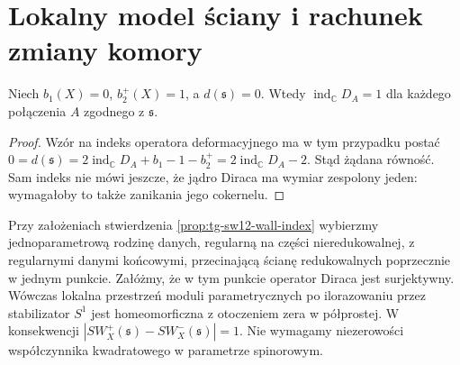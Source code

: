 \section{Lokalny model ściany i rachunek zmiany komory}
\label{sec:tg-sw12-wall}

\begin{stwierdzenie}
\label{prop:tg-sw12-wall-index}
Niech $b_1(X)=0$, $b_2^+(X)=1$, a
$d(\mathfrak s)=0$. Wtedy
$\operatorname{ind}_\mathbb C D_A=1$
dla każdego połączenia $A$ zgodnego z $\mathfrak s$.
\end{stwierdzenie}

\begin{proof}
Wzór na indeks operatora deformacyjnego ma w tym
przypadku postać
$0=d(\mathfrak s)=2\operatorname{ind}_\mathbb C D_A
+b_1-1-b_2^+=2\operatorname{ind}_\mathbb C D_A-2$.
Stąd żądana równość. Sam indeks nie mówi jeszcze,
że jądro Diraca ma wymiar zespolony jeden: wymagałoby
to także zanikania jego cokernelu.
\end{proof}

\begin{twierdzenie}
\label{thm:tg-sw12-wall-model}
Przy założeniach stwierdzenia
\ref{prop:tg-sw12-wall-index} wybierzmy
jednoparametrową rodzinę danych, regularną
na części nieredukowalnej, z regularnymi
danymi końcowymi, przecinającą ścianę
redukowalnych poprzecznie w jednym punkcie.
Załóżmy, że w tym punkcie operator Diraca jest
surjektywny. Wówczas lokalna przestrzeń
moduli parametrycznych po ilorazowaniu
przez stabilizator $S^1$ jest homeomorficzna
z otoczeniem zera w półprostej.
W konsekwencji
$|SW_X^+(\mathfrak s)-SW_X^-(\mathfrak s)|=1$.
Nie wymagamy niezerowości współczynnika
kwadratowego w parametrze spinorowym.
\end{twierdzenie}

